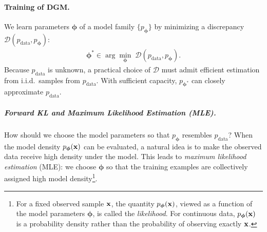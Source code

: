 

\paragraph{Training of DGM.}
We learn parameters $\bm{\phi}$ of a model family $\{p_{\bm{\phi}}\}$ by minimizing a discrepancy $\mathcal{D}(p_{\mathrm{data}},p_{\bm{\phi}})$:
\begin{align}\label{eq:dgm-optimization}
  \bm{\phi}^\ast \in \arg\min_{\bm{\phi}}\; \mathcal{D}(p_{\mathrm{data}},p_{\bm{\phi}}).
\end{align}
Because $p_{\mathrm{data}}$ is unknown, a practical choice of $\mathcal{D}$ must admit efficient estimation from i.i.d.\ samples
from $ p_{\mathrm{data}}$. With sufficient capacity, $p_{\bm{\phi}^\ast}$ can closely approximate $p_{\mathrm{data}}$.

\subparagraph{Forward KL and Maximum Likelihood Estimation (MLE).}
How should we choose the model parameters so that
$p_{\bm{\phi}}$ resembles $p_{\mathrm{data}}$?
When the model density $p_{\bm{\phi}}({\mathbf{x}})$ can be evaluated, a natural idea is
to make the observed data receive high density under the model.
This leads to \emph{maximum likelihood estimation} (MLE): we choose
$\bm{\phi}$ so that the training examples are collectively assigned high model
density\footnote{For a fixed observed sample ${\mathbf{x}}$, the quantity
$p_{\bm{\phi}}({\mathbf{x}})$, viewed as a function of the model parameters
$\bm{\phi}$, is called the \emph{likelihood}. For continuous data,
$p_{\bm{\phi}}({\mathbf{x}})$ is a probability density rather than the probability of
observing exactly ${\mathbf{x}}$.}.

